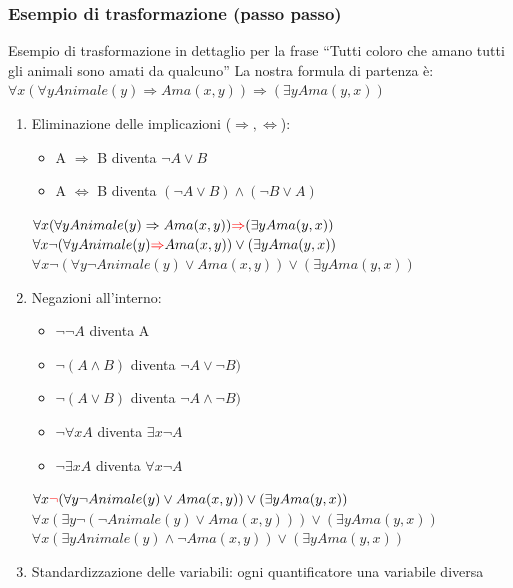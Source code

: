 \documentclass{article}
\begin{document}
\subsubsection{Esempio di trasformazione (passo passo)}
Esempio di trasformazione in dettaglio per la frase “Tutti coloro che amano tutti gli animali sono amati da qualcuno” \newline 
La nostra formula di partenza è: $\forall x ( \forall y Animale(y) \Rightarrow Ama(x,y)) \Rightarrow (\exists y Ama(y, x))$
\begin{enumerate}
    \item Eliminazione delle implicazioni ($\Rightarrow, \Leftrightarrow$):
        \begin{itemize}
            \item A $\Rightarrow$ B diventa	$\neg A \lor B$
            \item A $\Leftrightarrow$ B diventa $(\neg A \lor B) \land (\neg B \lor A)$
        \end{itemize}
    $\forall x (\forall y Animale(y) \Rightarrow Ama(x,y)) \textcolor{red}{\Rightarrow} (\exists y Ama(y, x))$ \newline
    $\forall x \neg (\forall y Animale(y) \textcolor{red}{\Rightarrow} Ama(x,y)) \lor (\exists y Ama(y, x))$ \newline
    $\forall x \neg (\forall y \neg Animale(y) \lor Ama(x,y)) \lor (\exists y Ama(y, x))$
    \item Negazioni all'interno:
        \begin{itemize}
            \item $\neg \neg A$ diventa A
            \item $\neg (A \land B)$ diventa $\neg A \lor \neg B)$
            \item $\neg (A \lor B)$ diventa $\neg A \land \neg B)$
            \item $\neg \forall x A$ diventa $\exists x \neg A$
            \item $\neg \exists x A $ diventa $\forall x \neg A$
        \end{itemize}
    $\forall x \textcolor{red}{\neg} (\forall y \neg Animale(y) \lor Ama(x,y)) \lor (\exists y Ama(y, x))$ \newline
    $\forall x (\exists y \neg (\neg Animale(y) \lor Ama(x,y))) \lor (\exists y Ama(y, x))$ \newline
    $\forall x (\exists y Animale(y) \land \neg Ama(x,y)) \lor (\exists y Ama(y, x))$
    \item Standardizzazione delle variabili: ogni quantificatore una variabile diversa \newline

\end{enumerate}
\end{document}

